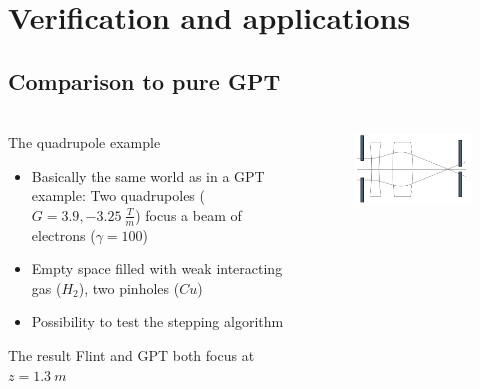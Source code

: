 \documentclass{beamer}
\newcommand{\ident}{\thesection.\thesubsection}
\newcommand{\mysubsection}[1]{\subsection{#1}\label{\ident}}
\newcommand{\ftitle}{\frametitle{\nameref{\ident}}}
\begin{document}
\section{Verification and applications}

\mysubsection{Comparison to pure GPT}

\begin{frame}
	\ftitle
	\begin{columns}
		\begin{column}{7.1cm}
			\begin{block}{The quadrupole example}
				\begin{itemize}
					\item Basically the same world as in a GPT example: Two quadrupoles ($G = 3.9, -3.25 ~\frac{T}{m}$) focus a beam of electrons ($\gamma = 100$)
					\item Empty space filled with weak interacting gas ($H_2$), two pinholes ($Cu$)
					\item Possibility to test the stepping algorithm
				\end{itemize}
			\end{block}
			\pause
			\begin{exampleblock}{The result}
				Flint and GPT both focus at $z = 1.3~m$
			\end{exampleblock}
		\end{column}
		\begin{column}{4cm}
			\begin{figure}
				\includegraphics[width=\columnwidth]{img/quadrupole_setup}\\\vskip 12pt

\end{figure}
\end{column}
\end{columns}
\end{frame}
\end{document}
